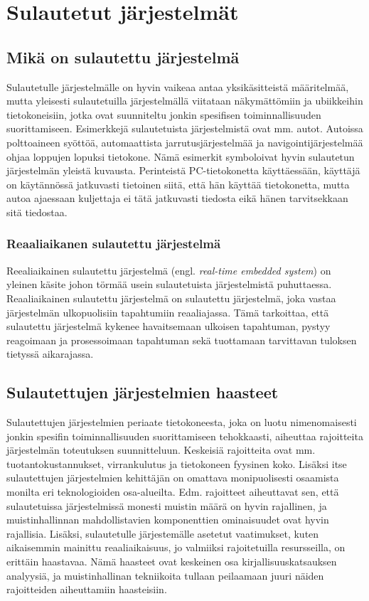 \chapter{Sulautetut järjestelmät} \label{Kolmas luku}

\section{Mikä on sulautettu järjestelmä}

Sulautetulle järjestelmälle on hyvin vaikeaa antaa yksikäsitteistä määritelmää, mutta yleisesti sulautetuilla järjestelmällä viitataan näkymättömiin ja ubiikkeihin tietokoneisiin, jotka ovat suunniteltu jonkin spesifisen toiminnallisuuden suorittamiseen. Esimerkkejä sulautetuista järjestelmistä ovat mm. autot. Autoissa polttoaineen syöttöä, automaattista jarrutusjärjestelmää ja navigointijärjestelmää ohjaa loppujen lopuksi tietokone.\cite{rtcfes2015book} Nämä esimerkit symboloivat hyvin sulautetun järjestelmän yleistä kuvausta. Perinteistä PC-tietokonetta käyttäessään, käyttäjä on käytännössä jatkuvasti tietoinen siitä, että hän käyttää tietokonetta, mutta autoa ajaessaan kuljettaja ei tätä jatkuvasti tiedosta eikä hänen tarvitsekkaan sitä tiedostaa.

\subsection{Reaaliaikanen sulautettu järjestelmä}

Reealiaikainen sulautettu järjestelmä (engl. \textit{real-time embedded system}) on yleinen käsite johon törmää usein sulautetuista järjestelmistä puhuttaessa. Reaaliaikainen sulautettu järjestelmä on sulautettu järjestelmä, joka vastaa järjestelmän ulkopuolisiin tapahtumiin reaaliajassa. Tämä tarkoittaa, että sulautettu järjestelmä kykenee havaitsemaan ulkoisen tapahtuman, pystyy reagoimaan ja prosessoimaan tapahtuman sekä tuottamaan tarvittavan tuloksen tietyssä aikarajassa.\cite{rtcfes2015book}

\section{Sulautettujen järjestelmien haasteet} 

Sulautettujen järjestelmien periaate tietokoneesta, joka on luotu nimenomaisesti jonkin spesifin toiminnallisuuden suorittamiseen tehokkaasti, aiheuttaa rajoitteita järjestelmän toteutuksen suunnitteluun. Keskeisiä rajoitteita ovat mm. tuotantokustannukset, virrankulutus ja tietokoneen fyysinen koko. Lisäksi itse sulautettujen järjestelmien kehittäjän on omattava monipuolisesti osaamista monilta eri teknologioiden osa-alueilta.\cite{rtcfes2015book} Edm. rajoitteet aiheuttavat sen, että sulautetuissa järjestelmissä monesti muistin määrä on hyvin rajallinen, ja muistinhallinnan mahdollistavien komponenttien ominaisuudet ovat hyvin rajallisia. Lisäksi, sulautetulle järjestemälle asetetut vaatimukset, kuten aikaisemmin mainittu reaaliaikaisuus, jo valmiiksi rajoitetuilla resursseilla, on erittäin haastavaa. Nämä haasteet ovat keskeinen osa kirjallisuuskatsauksen analyysiä, ja muistinhallinan tekniikoita tullaan peilaamaan juuri näiden rajoitteiden aiheuttamiin haasteisiin.


